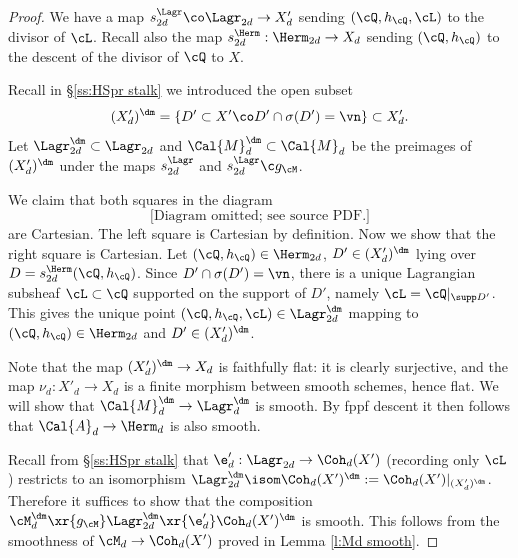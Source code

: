 \begin{proof}
We have a map $s^{\Lagr}_{2d} \co \Lagr_{2d}\to X'_{d}$ sending $(\cQ,h_{\cQ},\cL)$ to the divisor of $\cL$. Recall also the map $s^{\Herm}_{2d}: \Herm_{2d}\to X_{d}$ sending $(\cQ,h_{\cQ})$ to the descent of the divisor of $\cQ$ to $X$.

Recall in \S\ref{ss:HSpr stalk} we introduced the open subset
\[
(X_d')^{\dm} = \{D' \subset X' \co D' \cap \sigma(D') = \vn\} \subset X_d'.
\]
Let $\Lagr_{2d}^{\dm} \subset \Lagr_{2d}$ and $\Cal{M}_d^{\dm} \subset \Cal{M}_d$ be the preimages of $(X'_{d})^{\dm}$ under the maps $s^{\Lagr}_{2d}$ and $s^{\Lagr}_{2d}\c g_{\cM}$.


We claim that both squares in the diagram
\[
\text{[Diagram omitted; see source PDF.]}
\]
are Cartesian. The left square is Cartesian by definition. Now we show that the right square is Cartesian. Let $(\cQ ,h_{\cQ})\in \Herm_{2d}$,  $D' \in (X_d')^{\dm}$ lying over $D=s^{\Herm}_{2d}(\cQ,h_{\cQ})$. Since  $D'\cap\sigma(D')=\vn$, there is a unique Lagrangian subsheaf $\cL \subset \cQ$ supported on the support of $D'$, namely $\cL=\cQ|_{\supp D'}$. This gives the unique point $(\cQ,h_{\cQ}, \cL)\in \Lagr^{\dm}_{2d}$ mapping to $(\cQ,h_{\cQ})\in \Herm_{2d}$ and $D'\in (X'_{d})^{\dm}$.

Note that the map $(X'_d)^{\dm} \rightarrow X_d$ is faithfully flat: it is clearly surjective, and the map $\nu_{d}: X'_d \rightarrow X_d$ is a finite morphism between smooth schemes, hence flat. We will show that $\Cal{M}_d^{\dm} \rightarrow \Lagr_d^{\dm}$ is smooth. By fppf descent it then follows that $\Cal{A}_d \rightarrow \Herm_d$ is also smooth.

Recall from \S\ref{ss:HSpr stalk} that $\e'_{d}: \Lagr_{2d}\to \Coh_{d}(X')$ (recording only $\cL$) restricts to an isomorphism $\Lagr_{2d}^{\dm}\isom \Coh_{d}(X')^{\dm}:=\Coh_d(X')|_{(X_d')^{\dm}}$. Therefore it suffices to show that the composition $\cM_{d}^{\dm}\xr{g_{\cM}}\Lagr_{2d}^{\dm}\xr{\e'_{d}} \Coh_{d}(X')^{\dm}$ is smooth. This follows from the smoothness of $\cM_{d}\to \Coh_{d}(X')$ proved in Lemma \ref{l:Md smooth}.
\end{proof}

